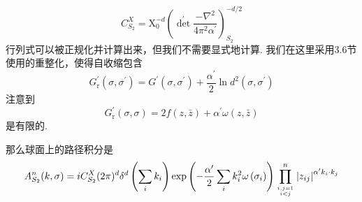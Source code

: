 \begin{equation}
	C_{S_{2}}^{X}=\mathrm{X}_{0}^{-d}\left(\operatorname{det}^{\prime} \frac{-\nabla^{2}}{4 \pi^{2} \alpha^{\prime}}\right)_{S_{2}}^{-d / 2}
\end{equation}
行列式可以被正规化并计算出来，但我们不需要显式地计算. 我们在这里采用3.6节使用的重整化，使得自收缩包含
\begin{equation}
	G_{\mathrm{r}}^{\prime}\left(\sigma, \sigma^{\prime}\right)=G^{\prime}\left(\sigma, \sigma^{\prime}\right)+\frac{\alpha^{\prime}}{2} \ln d^{2}\left(\sigma, \sigma^{\prime}\right)
\end{equation}
注意到
\begin{equation}
	G_{\mathrm{r}}^{\prime}(\sigma, \sigma)=2 f(z, \bar{z})+\alpha^{\prime} \omega(z, \bar{z})
\end{equation}
是有限的\footnotemark[2]. \\

那么球面上的路径积分是\footnotemark[3]
\begin{equation}
	A_{S_{2}}^{n}(k, \sigma)=i C_{S_{2}}^{X}(2 \pi)^{d} \delta^{d}\left(\sum_{i} k_{i}\right) \exp \left(-\frac{\alpha^{\prime}}{2} \sum_{i} k_{i}^{2} \omega\left(\sigma_{i}\right)\right) \prod_{i, j=1 \atop i<j}^{n}\left|z_{i j}\right|^{\alpha^{\prime} k_{i} \cdot k_{j}}
\end{equation}

